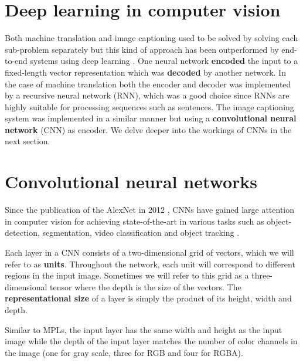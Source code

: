 \section{Deep learning in computer vision}

Both machine translation and image captioning used to be solved by solving each sub-problem separately but this kind of approach has been outperformed by end-to-end systems using deep learning \cite{machine_translation_attention, ShowAndTell}. One neural network \textbf{encoded} the input to a fixed-length vector representation which was \textbf{decoded} by another network. In the case of machine translation both the encoder and decoder was implemented by a recursive neural network (RNN), which was a good choice since RNNs are highly suitable for processing sequences such as sentences. The image captioning system was implemented in a similar manner but using a \textbf{convolutional neural network} (CNN) as encoder. We delve deeper into the workings of CNNs in the next section.


\section{Convolutional neural networks}

Since the publication of the AlexNet in 2012 \cite{AlexNet}, CNNs have gained large attention in computer vision for achieving state-of-the-art in various tasks such as object-detection, segmentation, video classification and object tracking \cite{InceptionV3}.


Each layer in a CNN consists of a two-dimensional grid of vectors, which we will refer to as \textbf{units}. Throughout the network, each unit will correspond to different regions in the input image. Sometimes we will refer to this grid as a three-dimensional tensor where the depth is the size of the vectors. The \textbf{representational size} of a layer is simply the product of its height, width and depth.



Similar to MPLs, the input layer has the same width and height as the input image while the depth of the input layer matches the number of color channels in the image (one for gray scale, three for RGB and four for RGBA).

